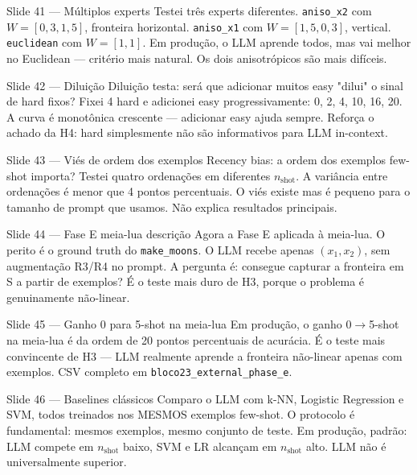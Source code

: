 \documentclass[aspectratio=169,10pt]{beamer}
\begin{document}
\begin{frame}{Slide 41 --- M\'ultiplos experts}
\footnotesize
Testei tr\^es experts diferentes. \texttt{aniso\_x2} com $W = [0{,}3, 1{,}5]$, fronteira horizontal. \texttt{aniso\_x1} com $W = [1{,}5, 0{,}3]$, vertical. \texttt{euclidean} com $W = [1, 1]$. Em produ\c{c}\~ao, o LLM aprende todos, mas vai melhor no Euclidean --- crit\'erio mais natural. Os dois anisotr\'opicos s\~ao mais dif\'iceis.
\end{frame}

\begin{frame}{Slide 42 --- Dilui\c{c}\~ao}
\footnotesize
Dilui\c{c}\~ao testa: ser\'a que adicionar muitos easy "dilui" o sinal de hard fixos? Fixei 4 hard e adicionei easy progressivamente: 0, 2, 4, 10, 16, 20. A curva \'e monot\^onica crescente --- adicionar easy ajuda sempre. Refor\c{c}a o achado da H4: hard simplesmente n\~ao s\~ao informativos para LLM in-context.
\end{frame}

\begin{frame}{Slide 43 --- Vi\'es de ordem dos exemplos}
\footnotesize
Recency bias: a ordem dos exemplos few-shot importa? Testei quatro ordena\c{c}\~oes em diferentes $n_{\text{shot}}$. A vari\^ancia entre ordena\c{c}\~oes \'e menor que 4 pontos percentuais. O vi\'es existe mas \'e pequeno para o tamanho de prompt que usamos. N\~ao explica resultados principais.
\end{frame}

\begin{frame}{Slide 44 --- Fase E meia-lua descri\c{c}\~ao}
\footnotesize
Agora a Fase E aplicada \`a meia-lua. O perito \'e o ground truth do \texttt{make\_moons}. O LLM recebe apenas $(x_1, x_2)$, sem augmenta\c{c}\~ao R3/R4 no prompt. A pergunta \'e: consegue capturar a fronteira em S a partir de exemplos? \'E o teste mais duro de H3, porque o problema \'e genuinamente n\~ao-linear.
\end{frame}

\begin{frame}{Slide 45 --- Ganho 0 para 5-shot na meia-lua}
\footnotesize
Em produ\c{c}\~ao, o ganho 0$\to$5-shot na meia-lua \'e da ordem de 20 pontos percentuais de acur\'acia. \'E o teste mais convincente de H3 --- LLM realmente aprende a fronteira n\~ao-linear apenas com exemplos. CSV completo em \texttt{bloco23\_external\_phase\_e}.
\end{frame}

\begin{frame}{Slide 46 --- Baselines cl\'assicos}
\footnotesize
Comparo o LLM com k-NN, Logistic Regression e SVM, todos treinados nos MESMOS exemplos few-shot. O protocolo \'e fundamental: mesmos exemplos, mesmo conjunto de teste. Em produ\c{c}\~ao, padr\~ao: LLM compete em $n_{\text{shot}}$ baixo, SVM e LR alcan\c{c}am em $n_{\text{shot}}$ alto. LLM n\~ao \'e universalmente superior.
\end{frame}
\end{document}
